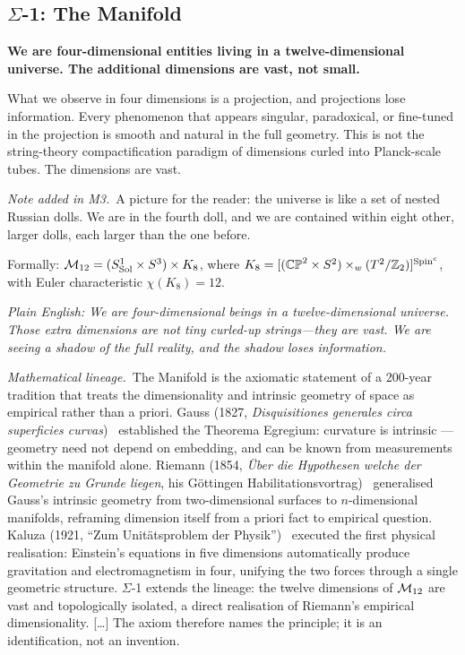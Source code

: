 \subsection*{$\Sigma$-1: The Manifold}
\par\smallskip
\textbf{We are four-dimensional entities living in a twelve-dimensional universe.  The additional dimensions are vast, not small.}

What we observe in four dimensions is a projection, and projections lose information.  Every phenomenon that appears singular, paradoxical, or fine-tuned in the projection is smooth and natural in the full geometry.  This is not the string-theory compactification paradigm of dimensions curled into Planck-scale tubes.  The dimensions are vast.

\noindent\emph{Note added in M3.}\ A picture for the reader: the universe is like a set of nested Russian dolls. We are in the fourth doll, and we are contained within eight other, larger dolls, each larger than the one before.

Formally: $\mathcal{M}_{12} = (S^1_{\mathrm{Sol}} \times S^3) \times K_8$, where $K_8 = [(\mathbb{CP}^2 \times S^2) \times_w (T^2/\mathbb{Z}_2)]^{\text{Spin}^c}$, with Euler characteristic $\chi(K_8) = 12$.

\emph{Plain English: We are four-dimensional beings in a twelve-dimensional universe.  Those extra dimensions are not tiny curled-up strings---they are vast.  We are seeing a shadow of the full reality, and the shadow loses information.}

\smallskip

\noindent\emph{Mathematical lineage.}\ The Manifold is the axiomatic statement of a 200-year tradition that treats the dimensionality and intrinsic geometry of space as empirical rather than a priori.  Gauss (1827, \emph{Disquisitiones generales circa superficies curvas})~\cite{Gauss1827} established the Theorema Egregium: curvature is intrinsic --- geometry need not depend on embedding, and can be known from measurements within the manifold alone.  Riemann (1854, \emph{\"{U}ber die Hypothesen welche der Geometrie zu Grunde liegen}, his G\"{o}ttingen Habilitationsvortrag)~\cite{Riemann1868} generalised Gauss's intrinsic geometry from two-dimensional surfaces to $n$-dimensional manifolds, reframing dimension itself from a priori fact to empirical question.  Kaluza (1921, ``Zum Unit\"{a}tsproblem der Physik'')~\cite{Kaluza1921} executed the first physical realisation: Einstein's equations in five dimensions automatically produce gravitation and electromagnetism in four, unifying the two forces through a single geometric structure.  $\Sigma$-1 extends the lineage: the twelve dimensions of $\mathcal{M}_{12}$ are vast and topologically isolated, a direct realisation of Riemann's empirical dimensionality. [\ldots]  The axiom therefore names the principle; it is an identification, not an invention.

